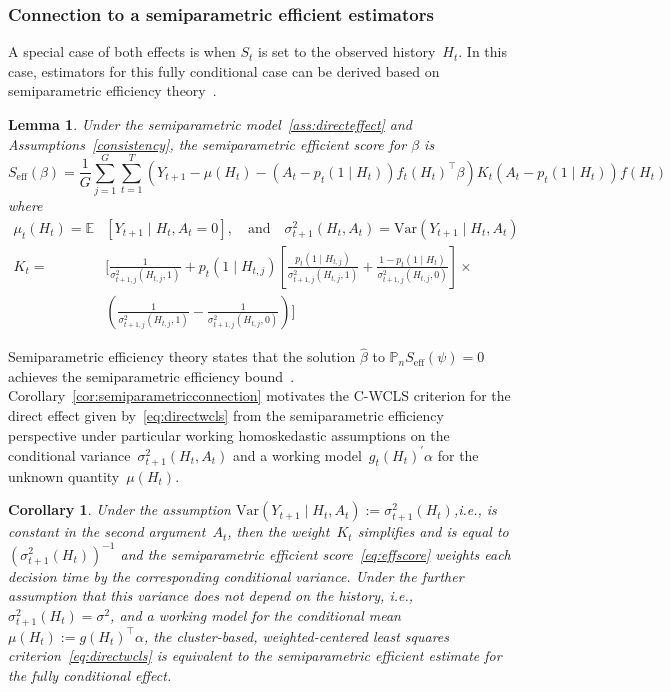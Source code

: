 \documentclass[12pt]{article}
\newtheorem{lemma}[thm]{Lemma}
\newtheorem{cor}[thm]{Corollary}
\begin{document}
\subsubsection{Connection to a semiparametric efficient estimators}

A special case of both effects is when $S_t$ is set to the observed history~$H_t$.  In this case, estimators for this fully conditional case can be derived based on semiparametric efficiency theory~\citep{Newey1990,Tsiatis2007}.
\begin{lemma}
Under the semiparametric model~\eqref{ass:directeffect} and Assumptions~\ref{consistency}, the semiparametric efficient score for $\beta$ is
\begin{equation}
\label{eq:effscore}
S_{\text{eff}} (\beta) = \frac{1}{G} \sum_{j=1}^G \sum_{t=1}^T (Y_{t+1} - \mu (H_t) - (A_t - p_t (1 \mid H_t)) f_t ( H_t)^\top \beta ) K_t (A_t - p_t(1 \mid H_t)) f(H_t)
\end{equation}
where
\begin{align*}
\mu_t (H_t) = \mathbb{E} &\left[ Y_{t+1} \mid H_t, A_t = 0 \right], \quad \text{and} \quad \sigma^2_{t+1} (H_t, A_t) = \text{Var} \left( Y_{t+1} \mid H_t, A_t \right) \\
K_t = &\bigg[ \frac{1}{\sigma^2_{t+1,j} (H_{t,j}, 1)} + p_t ( 1 \mid H_{t,j}) \left[  \frac{p_t (1 \mid H_{t,j} )}{\sigma^2_{t+1,j} (H_{t,j}, 1)} + \frac{1-p_t (1 \mid H_t )}{\sigma^2_{t+1,j} (H_{t,j}, 0)} \right] \times \\
&\left( \frac{1}{\sigma^2_{t+1,j} (H_{t,j}, 1)}  - \frac{1}{\sigma^2_{t+1,j} (H_{t,j}, 0)} \right)
 \bigg]
\end{align*}
\end{lemma}

Semiparametric efficiency theory states that the solution $\hat \beta$ to $\mathbb{P}_n S_{\text{eff}} (\psi) = 0$ achieves the semiparametric efficiency bound~\citep{Newey1990}.  Corollary~\eqref{cor:semiparametricconnection} motivates the C-WCLS criterion for the direct effect given by~\eqref{eq:directwcls} from the semiparametric efficiency perspective under particular working homoskedastic assumptions on the conditional variance~$\sigma^2_{t+1} (H_t, A_t)$ and a working model~$g_t (H_t)^\prime \alpha$ for the unknown quantity~$\mu(H_t)$.

\begin{cor}
\label{cor:semiparametricconnection}
Under the assumption $\text{Var}(Y_{t+1} \mid H_t, A_t) := \sigma^2_{t+1}(H_t)$,i.e., is constant in the second argument~$A_t$, then the weight~$K_t$ simplifies and is equal to $(\sigma^2_{t+1}(H_t))^{-1}$ and the semiparametric efficient score~\eqref{eq:effscore} weights each decision time by the corresponding conditional variance.  Under the further assumption that this variance does not depend on the history, i.e., $\sigma^2_{t+1} (H_t) = \sigma^2$, and a working model for the conditional mean $\mu (H_t) := g (H_t)^\top \alpha$, the cluster-based, weighted-centered least squares criterion~\eqref{eq:directwcls} is equivalent to the semiparametric efficient estimate for the fully conditional effect.
\end{cor}
\end{document}

